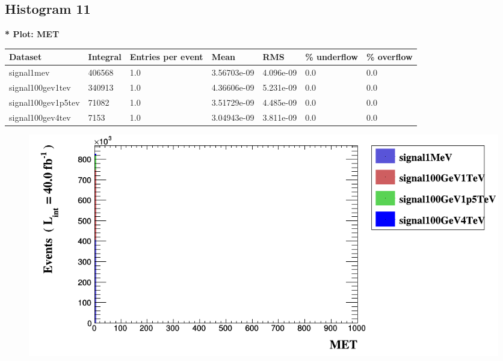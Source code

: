 \documentclass[a4paper, 10pt]{article}
\begin{document}
\subsection{ Histogram 11}

\textbf{* Plot: MET}\\
   \begin{table}[H]
  \begin{center}
    \begin{tabular}{|m{23.0mm}|m{23.0mm}|m{18.0mm}|m{19.0mm}|m{19.0mm}|m{19.0mm}|m{19.0mm}|}
      \hline
      {\cellcolor{yellow}         Dataset}& {\cellcolor{yellow}         Integral}& {\cellcolor{yellow}         Entries per event}& {\cellcolor{yellow}         Mean}& {\cellcolor{yellow}         RMS}& {\cellcolor{yellow}         \% underflow}& {\cellcolor{yellow}         \% overflow}\\
      \hline
      {\cellcolor{white}         signal1mev}& {\cellcolor{white}         406568}& {\cellcolor{white}         1.0}& {\cellcolor{white}         3.56703e-09}& {\cellcolor{white}         4.096e-09}& {\cellcolor{green}         0.0}& {\cellcolor{green}         0.0}\\
      \hline
      {\cellcolor{white}         signal100gev1tev}& {\cellcolor{white}         340913}& {\cellcolor{white}         1.0}& {\cellcolor{white}         4.36606e-09}& {\cellcolor{white}         5.231e-09}& {\cellcolor{green}         0.0}& {\cellcolor{green}         0.0}\\
      \hline
      {\cellcolor{white}         signal100gev1p5tev}& {\cellcolor{white}         71082}& {\cellcolor{white}         1.0}& {\cellcolor{white}         3.51729e-09}& {\cellcolor{white}         4.485e-09}& {\cellcolor{green}         0.0}& {\cellcolor{green}         0.0}\\
      \hline
      {\cellcolor{white}         signal100gev4tev}& {\cellcolor{white}         7153}& {\cellcolor{white}         1.0}& {\cellcolor{white}         3.04943e-09}& {\cellcolor{white}         3.811e-09}& {\cellcolor{green}         0.0}& {\cellcolor{green}         0.0}\\
\hline
    \end{tabular}
  \end{center}
\end{table}

\begin{figure}[H]
  \begin{center}
    \includegraphics[scale=0.45]{selection_10.png}\\
\caption{   }
  \end{center}
\end{figure}
      \newpage
\end{document}
